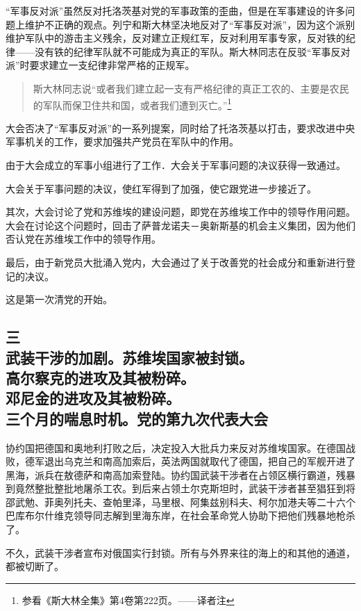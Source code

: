 “军事反对派”虽然反对托洛茨基对党的军事政策的歪曲，但是在军事建设的许多问题上维护不正确的观点。列宁和斯大林坚决地反对了“军事反对派”，因为这个派别维护军队中的游击主义残余，反对建立正规红军，反对利用军事专家，反对铁的纪律——没有铁的纪律军队就不可能成为真正的军队。斯大林同志在反驳“军事反对派”时要求建立一支纪律非常严格的正规军。

\begin{quotation}
斯大林同志说“或者我们建立起一支有严格纪律的真正工农的、主要是农民的军队而保卫住共和国，或者我们遭到灭亡。”\footnote{参看《斯大林全集》第4卷第222页。——译者注}
\end{quotation}

大会否决了“军事反对派”的一系列提案，同时给了托洛茨基以打击，要求改进中央军事机关的工作，要求加强共产党员在军队中的作用。

由于大会成立的军事小组进行了工作．大会关于军事问题的决议获得一致通过。

大会关于军事问题的决议，使红军得到了加强，使它跟党进一步接近了。

其次，大会讨论了党和苏维埃的建设问题，即党在苏维埃工作中的领导作用问题。大会在讨论这个问题时，回击了萨普龙诺夫－奥新斯基的机会主义集团，因为他们否认党在苏维埃工作中的领导作用。

最后，由于新党员大批涌入党内，大会通过了关于改善党的社会成分和重新进行登记的决议。

这是第一次清党的开始。


\subsection[三\q 武装干涉的加剧。苏维埃国家被封锁。高尔察克的进攻及其被粉碎。邓尼金的进攻及其被粉碎。三个月的喘息时机。党的第九次代表大会]{三\\武装干涉的加剧。苏维埃国家被封锁。\\高尔察克的进攻及其被粉碎。\\邓尼金的进攻及其被粉碎。\\三个月的喘息时机。党的第九次代表大会}

协约国把德国和奥地利打败之后，决定投入大批兵力来反对苏维埃国家。在德国战败，德军退出乌克兰和南高加索后，英法两国就取代了德国，把自己的军舰开进了黑海，派兵在敖德萨和南高加索登陆。协约国武装干涉者在占领区横行霸道，残暴到竟然整批整批地屠杀工农。到后来占领土尔克斯坦时，武装干涉者甚至猖狂到将邵武勉、菲奥列托夫、查帕里泽，马里根、阿集兹别科夫、柯尔加港夫等二十六个巴库布尔什维克领导同志解到里海东岸，在社会革命党人协助下把他们残暴地枪杀了。

不久，武装干涉者宣布对俄国实行封锁。所有与外界来往的海上的和其他的通道，都被切断了。

